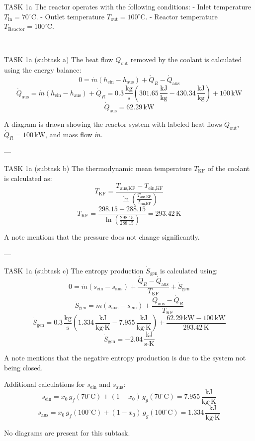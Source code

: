 TASK 1a  
The reactor operates with the following conditions:  
- Inlet temperature \( T_{\text{in}} = 70^\circ\text{C} \).  
- Outlet temperature \( T_{\text{out}} = 100^\circ\text{C} \).  
- Reactor temperature \( T_{\text{Reactor}} = 100^\circ\text{C} \).  

---

TASK 1a (subtask a)  
The heat flow \( \dot{Q}_{\text{out}} \) removed by the coolant is calculated using the energy balance:  
\[
0 = \dot{m} (h_{\text{ein}} - h_{\text{aus}}) + \dot{Q}_R - \dot{Q}_{\text{aus}}
\]  
\[
\dot{Q}_{\text{aus}} = \dot{m} (h_{\text{ein}} - h_{\text{aus}}) + \dot{Q}_R = 0.3 \, \frac{\text{kg}}{\text{s}} \left( 301.65 \, \frac{\text{kJ}}{\text{kg}} - 430.34 \, \frac{\text{kJ}}{\text{kg}} \right) + 100 \, \text{kW}
\]  
\[
\dot{Q}_{\text{aus}} = 62.29 \, \text{kW}
\]  

A diagram is drawn showing the reactor system with labeled heat flows \( \dot{Q}_{\text{out}} \), \( \dot{Q}_R = 100 \, \text{kW} \), and mass flow \( \dot{m} \).  

---

TASK 1a (subtask b)  
The thermodynamic mean temperature \( T_{\text{KF}} \) of the coolant is calculated as:  
\[
T_{\text{KF}} = \frac{T_{\text{aus,KF}} - T_{\text{ein,KF}}}{\ln \left( \frac{T_{\text{aus,KF}}}{T_{\text{ein,KF}}} \right)}
\]  
\[
T_{\text{KF}} = \frac{298.15 - 288.15}{\ln \left( \frac{298.15}{288.15} \right)} = 293.42 \, \text{K}
\]  

A note mentions that the pressure does not change significantly.  

---

TASK 1a (subtask c)  
The entropy production \( \dot{S}_{\text{gen}} \) is calculated using:  
\[
0 = \dot{m} (s_{\text{ein}} - s_{\text{aus}}) + \frac{\dot{Q}_R - \dot{Q}_{\text{aus}}}{T_{\text{KF}}} + \dot{S}_{\text{gen}}
\]  
\[
\dot{S}_{\text{gen}} = \dot{m} (s_{\text{aus}} - s_{\text{ein}}) + \frac{\dot{Q}_{\text{aus}} - \dot{Q}_R}{T_{\text{KF}}}
\]  
\[
\dot{S}_{\text{gen}} = 0.3 \, \frac{\text{kg}}{\text{s}} \left( 1.334 \, \frac{\text{kJ}}{\text{kg·K}} - 7.955 \, \frac{\text{kJ}}{\text{kg·K}} \right) + \frac{62.29 \, \text{kW} - 100 \, \text{kW}}{293.42 \, \text{K}}
\]  
\[
\dot{S}_{\text{gen}} = -2.04 \, \frac{\text{kJ}}{\text{s·K}}
\]  

A note mentions that the negative entropy production is due to the system not being closed.  

Additional calculations for \( s_{\text{ein}} \) and \( s_{\text{aus}} \):  
\[
s_{\text{ein}} = x_0 \, g_f(70^\circ\text{C}) + (1 - x_0) \, g_g(70^\circ\text{C}) = 7.955 \, \frac{\text{kJ}}{\text{kg·K}}
\]  
\[
s_{\text{aus}} = x_0 \, g_f(100^\circ\text{C}) + (1 - x_0) \, g_g(100^\circ\text{C}) = 1.334 \, \frac{\text{kJ}}{\text{kg·K}}
\]  

No diagrams are present for this subtask.